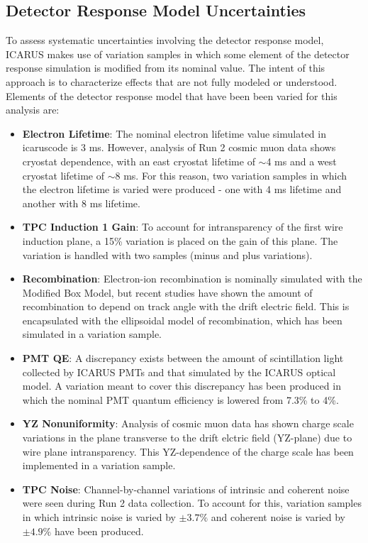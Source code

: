\documentclass[../main.tex]{subfiles}
\begin{document}
\subsection{Detector Response Model Uncertainties}
To assess systematic uncertainties involving the detector response model, ICARUS makes use of variation samples in which some element of the detector response simulation is modified from its nominal value.  The intent of this approach is to characterize effects that are not fully modeled or understood.  Elements of the detector response model that have been been varied for this analysis are:
\begin{itemize}
    \item \textbf{Electron Lifetime}: The nominal electron lifetime value simulated in icaruscode is 3 ms.  However, analysis of Run 2 cosmic muon data shows cryostat dependence, with an east cryostat lifetime of 
    $\sim$4 ms and a west cryostat lifetime of $\sim$8 ms.  For this reason, two variation samples in which the electron lifetime is varied were produced - one with 4 ms lifetime and another with 8 ms lifetime.
    \item \textbf{TPC Induction 1 Gain}: To account for intransparency of the first wire induction plane, a 15\% variation is placed on the gain of this plane.  The variation is handled with two samples (minus and plus variations).
    \item \textbf{Recombination}: Electron-ion recombination is nominally simulated with the Modified Box Model, but recent studies have shown the amount of recombination to depend on track angle with the drift electric field.  This is encapsulated with the ellipsoidal model of recombination, which has been simulated in a variation sample.
    \item \textbf{PMT QE}: A discrepancy exists between the amount of scintillation light collected by ICARUS PMTs and that simulated by the ICARUS optical model.  A variation meant to cover this discrepancy has been produced in which the nominal PMT quantum efficiency is lowered from 7.3\% to 4\%.
    \item \textbf{YZ Nonuniformity}: Analysis of cosmic muon data has shown charge scale variations in the plane transverse to the drift elctric field (YZ-plane) due to wire plane intransparency.  This YZ-dependence of the charge scale has been implemented in a variation sample. 
    \item \textbf{TPC Noise}: Channel-by-channel variations of intrinsic and coherent noise were seen during Run 2 data collection.  To account for this, variation samples in which intrinsic noise is varied by $\pm3.7\%$ and coherent noise is varied by $\pm4.9\%$ have been produced.
\end{itemize}
\end{document}

